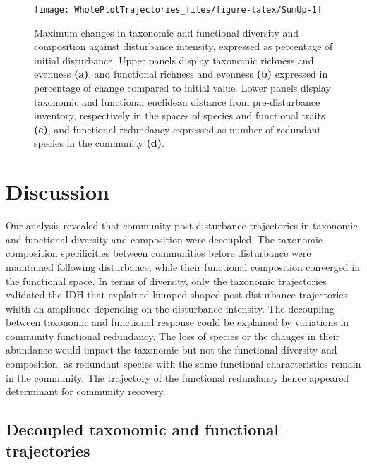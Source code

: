 \documentclass[fleqn,10pt]{ArtEcoFoG} %
\begin{document}
\begin{figure}

{\centering \texttt{[image: WholePlotTrajectories\_files/figure-latex/SumUp-1]} 

}

\caption{Maximum changes in taxonomic and functional diversity and composition against disturbance intensity, expressed as percentage of initial disturbance. Upper panels display taxonomic richness and evenness \textbf{(a)}, and functional richness and evenness \textbf{(b)} expressed in percentage of change compared to initial value. Lower panels display taxonomic and functional euclidean distance from pre-disturbance inventory, respectively in the spaces of species and functional traits \textbf{(c)}, and functional redundancy expressed as number of redundant species in the community \textbf{(d)}.}\label{fig:SumUp}
\end{figure}

\section{Discussion}\label{discussion}

\color{red}Our analysis revealed that community post-disturbance
trajectories in taxonomic and functional diversity and composition were
decoupled. The taxonomic composition specificities between communities
before disturbance were maintained following disturbance, while their
functional composition converged in the functional space. \color{black}
In terms of diversity, only the taxonomic trajectories validated the IDH
that explained humped-shaped post-disturbance trajectories whith an
amplitude depending on the disturbance intensity. The decoupling between
taxonomic and functional response \color{red} could be
\color{black}explained by variations in community functional redundancy.
\color{red}The loss of species or the changes in their abundance would
impact the taxonomic but not the functional diversity and composition,
as redundant species with the same functional characteristics remain in
the community. The trajectory of the functional redundancy hence
appeared determinant for community recovery.\color{black}

\subsection{Decoupled taxonomic and functional
trajectories}\label{decoupled-taxonomic-and-functional-trajectories}
\end{document}
